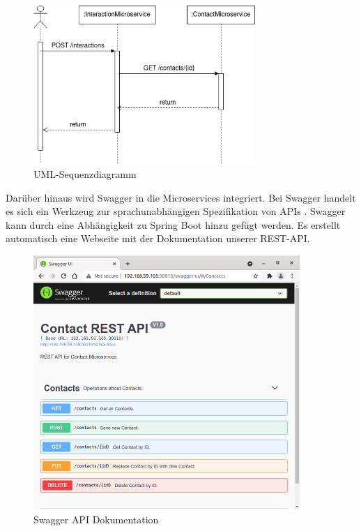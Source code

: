 \begin{figure}[H] 
    \centering
    \includegraphics[width=0.75\textwidth]{figures/UMLSequenzdiagramm.png}
    \caption{UML-Sequenzdiagramm}
\end{figure}

Darüber hinaus wird Swagger in die Microservices integriert. Bei Swagger handelt es sich ein Werkzeug zur sprachunabhängigen Spezifikation von APIs \parencite[vgl.][]{smartbearsoftwareSwagger2022}. Swagger kann durch eine Abhängigkeit zu Spring Boot hinzu gefügt werden. Es erstellt automatisch eine Webseite mit der Dokumentation unserer \ac{REST}-\ac{API}. 

\begin{figure}[H] 
    \centering
    \includegraphics[width=0.9\textwidth]{figures/KontaktAPISwagger.png}
    \caption{Swagger \ac{API} Dokumentation}
\end{figure}

